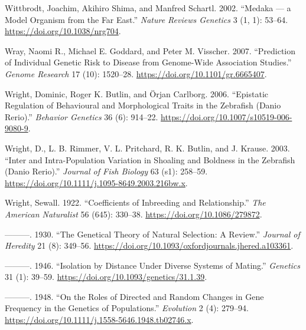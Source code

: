 \documentclass[
]{book}
\newlength{\cslhangindent}
\newlength{\cslentryspacingunit} %
\newenvironment{CSLReferences}[2] %
 {%
  \setlength{\parindent}{0pt}
  \ifodd #1
  \let\oldpar\par
  \def\par{\hangindent=\cslhangindent\oldpar}
  \fi
  \setlength{\parskip}{#2\cslentryspacingunit}
 }%
 {}
\begin{document}
\begin{CSLReferences}{1}{0}
\leavevmode{}%
Wittbrodt, Joachim, Akihiro Shima, and Manfred Schartl. 2002. {``Medaka --- a Model Organism from the Far East.''} \emph{Nature Reviews Genetics} 3 (1, 1): 53--64. \url{https://doi.org/10.1038/nrg704}.

\leavevmode{}%
Wray, Naomi R., Michael E. Goddard, and Peter M. Visscher. 2007. {``Prediction of Individual Genetic Risk to Disease from Genome-Wide Association Studies.''} \emph{Genome Research} 17 (10): 1520--28. \url{https://doi.org/10.1101/gr.6665407}.

\leavevmode{}%
Wright, Dominic, Roger K. Butlin, and Örjan Carlborg. 2006. {``Epistatic Regulation of Behavioural and Morphological Traits in the Zebrafish ({Danio} Rerio).''} \emph{Behavior Genetics} 36 (6): 914--22. \url{https://doi.org/10.1007/s10519-006-9080-9}.

\leavevmode{}%
Wright, D., L. B. Rimmer, V. L. Pritchard, R. K. Butlin, and J. Krause. 2003. {``Inter and Intra-Population Variation in Shoaling and Boldness in the Zebrafish ({Danio} Rerio).''} \emph{Journal of Fish Biology} 63 (s1): 258--59. \url{https://doi.org/10.1111/j.1095-8649.2003.216bw.x}.

\leavevmode{}%
Wright, Sewall. 1922. {``Coefficients of {Inbreeding} and {Relationship}.''} \emph{The American Naturalist} 56 (645): 330--38. \url{https://doi.org/10.1086/279872}.

\leavevmode{}%
---------. 1930. {``The {Genetical Theory} of {Natural Selection}: {A Review}.''} \emph{Journal of Heredity} 21 (8): 349--56. \url{https://doi.org/10.1093/oxfordjournals.jhered.a103361}.

\leavevmode{}%
---------. 1946. {``Isolation by {Distance} Under {Diverse Systems} of {Mating}.''} \emph{Genetics} 31 (1): 39--59. \url{https://doi.org/10.1093/genetics/31.1.39}.

\leavevmode{}%
---------. 1948. {``On the {Roles} of {Directed} and {Random Changes} in {Gene Frequency} in the {Genetics} of {Populations}.''} \emph{Evolution} 2 (4): 279--94. \url{https://doi.org/10.1111/j.1558-5646.1948.tb02746.x}.


\end{CSLReferences}
\end{document}
